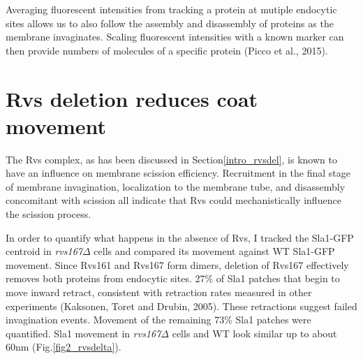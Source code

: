 \vspace{5mm}
Averaging fluorescent intensities from tracking a protein at mutiple endocytic sites allows us to also follow the assembly and disassembly of proteins as the membrane invaginates. Scaling fluorescent intensities with a known marker can then provide numbers of molecules of a specific protein (Picco et al., 2015). 

\newpage
\section{Rvs deletion reduces coat movement}
\label{sec:rvsdel}
The Rvs complex, as has been discussed in Section\ref{intro_rvsdel}, is known to have an influence on membrane scission efficiency. Recruitment in the final stage of membrane invagination, localization to the membrane tube, and disassembly concomitant with scission all indicate that Rvs could mechanistically influence the scission process.

	\vspace{5mm}
In order to quantify what happens in the absence of Rvs, I tracked the Sla1-GFP centroid in \textit{rvs167$\Delta$} cells and compared its movement against WT Sla1-GFP movement. Since Rvs161 and Rvs167 form dimers, deletion of Rvs167 effectively removes both proteins from endocytic sites. 27\% of Sla1 patches that begin to move inward retract, consistent with retraction rates measured in other experiments (Kaksonen, Toret and Drubin, 2005). These retractions suggest failed invagination events. Movement of the remaining 73\% Sla1 patches were quantified. Sla1 movement in \textit{rvs167$\Delta$} cells and WT look similar up to about 60nm (Fig.\ref{fig2_rvsdelta}). 

\vspace{2mm}
	
